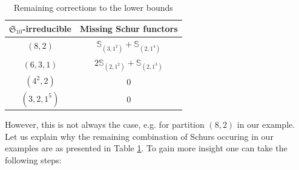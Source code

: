 \documentclass[12pt]{article}
\newcommand{\SymGroup}[1][n]{\mathfrak{S}_{#1}}
\newcommand{\Schur}[1]{\mathbb{S}_{#1}}
\theoremstyle{plain}
\theoremstyle{definition}
\theoremstyle{remark}
\begin{document}
\begin{table}[h]
    \centering
    \begin{tabular}{|c|c|}
\hline
$\SymGroup[10]$-irreducible & Missing Schur functors \\
\hline
$(8,2)$ & $\Schur{(3,1^2)} + \Schur{(2,1^4)}$ \\
\hline
$(6,3,1)$ &  $2\Schur{(2,1^2)} + \Schur{(2,1^3)}$\\
\hline
$(4^2,2)$ & $0$ \\
\hline
$(3,2,1^5)$ & $0$ \\
\hline
    \end{tabular}
    \caption{Remaining corrections to the lower bounds}
    \label{table:remaining_Schur}
\end{table}

However, this is not always the case, e.g. for partition $(8,2)$ in our example. Let us explain why the remaining combination of Schurs occuring in our examples are as presented in Table \ref{table:remaining_Schur}. To gain more insight one can take the following steps:
\end{document}
